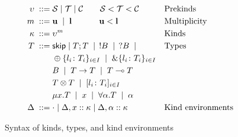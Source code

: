 \begin{figure}[t]
  \begin{align*}
    \upsilon \; ::= \;& \mathcal S \mid \mathcal T \mid \mathcal C  \qquad  \mathcal S
                     < \mathcal T < \mathcal C &&
\text{Prekinds}
    \\
    m \; ::= \; & \mathbf{u} \;\mid\; \mathbf{l} \;\quad\qquad \mathbf{u} <
               \mathbf{l}&&
\text{Multiplicity}
    \\
    \kappa \; ::= \;& \upsilon^m && \text{Kinds}
    \\
    T \; ::= \;& \mathsf{skip} \mid T;T \;\mid\; \,!B \;\mid\; \,?B  \;\mid\;
    && \text{Types}
    \\
    & \oplus\{l_i\colon T_i\}_{i\in I} \;\mid\; \&\{l_i\colon T_i\}_{i\in I}\\
    & B \;\mid\; T\to T \;\mid\; T\multimap T\\
    & T \otimes T \;\mid\; [l_i\colon T_i]_{i\in I}\\
    & \mu x.T \;\mid\; x \;\mid\; \forall\alpha.T  \;\mid\; \alpha 
    \\
    \Delta \; ::= \;& \cdot \mid \Delta, x :: \kappa \mid \Delta, \alpha
                   :: \kappa && \text{Kind environments}
  \end{align*}
  \caption{Syntax of kinds, types, and kind environments}
  \label{fig:types}
\end{figure}

